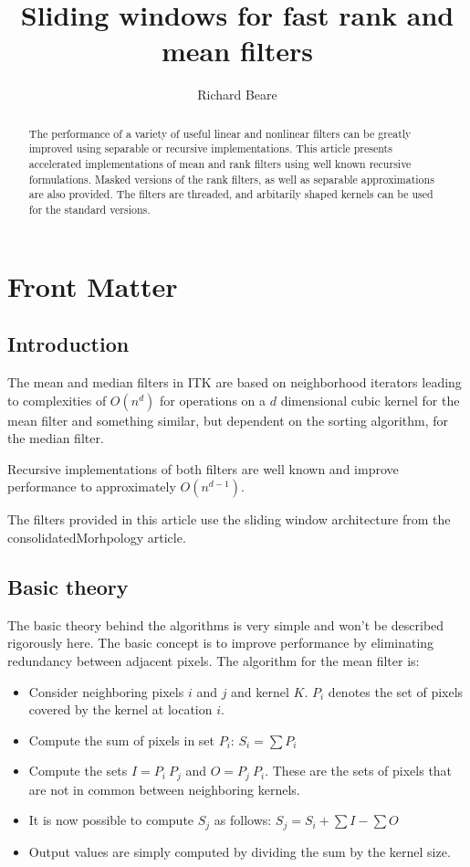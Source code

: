 \documentclass{InsightArticle}
\title{Sliding windows for fast rank and mean filters}
\author{Richard Beare}
\begin{document}
\maketitle

\ifhtml
\chapter*{Front Matter\label{front}}
\fi


\begin{abstract}
\noindent
The performance of a variety of useful linear and nonlinear filters
can be greatly improved using separable or recursive
implementations. This article presents accelerated implementations of
mean and rank filters using well known recursive formulations. Masked
versions of the rank filters, as well as separable approximations are
also provided. The filters are threaded, and arbitarily shaped kernels
can be used for the standard versions.
\end{abstract}

\tableofcontents

\section{Introduction}
The mean and median filters in ITK are based on neighborhood iterators
leading to complexities of $O(n^d)$ for operations on a $d$
dimensional cubic kernel for the mean filter and something similar,
but dependent on the sorting algorithm, for the median filter. 

Recursive implementations of both filters are well known
\cite{Huang79} and improve performance to approximately $O(n^{d-1})$.

The filters provided in this article use the sliding window
architecture from the consolidatedMorhpology article.

\section{Basic theory}
The basic theory behind the algorithms is very simple and won't be
described rigorously here. The basic concept is to improve performance
by eliminating redundancy between adjacent pixels. The algorithm for
the mean filter is:
\begin{itemize}
\item Consider neighboring pixels $i$ and $j$ and kernel $K$. $P_i$ 
      denotes the set of pixels covered by the kernel at location $i$.
\item Compute the sum of pixels in set $P_i$: $S_i = \sum P_i$
\item Compute the sets $I = P_i \ P_j$ and $O = P_j \ P_i$. These are 
      the sets of pixels that are not in common between neighboring kernels.
\item It is now possible to compute $S_j$ as follows: $S_j = S_i + \sum I - \sum O$
\item Output values are simply computed by dividing the sum by the kernel size.
\end{itemize}
\end{document}
